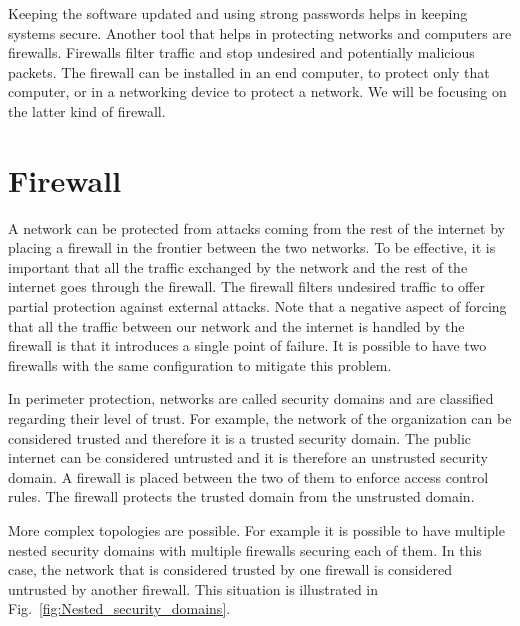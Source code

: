 Keeping the software updated and using strong passwords helps in keeping systems secure.
Another tool that helps in protecting networks and computers are firewalls.
Firewalls filter traffic and stop undesired and potentially malicious packets.
The firewall can be installed in an end computer, to protect only that computer, or in a networking device to protect a network.
We will be focusing on the latter kind of firewall.

\section{Firewall}

A network can be protected from attacks coming from the rest of the internet by placing a firewall in the frontier between the two networks.
To be effective, it is important that all the traffic exchanged by the network and the rest of the internet goes through the firewall.
The firewall filters undesired traffic to offer partial protection against external attacks.
Note that a negative aspect of forcing that all the traffic between our network and the internet is handled by the firewall is that it introduces a single point of failure.
It is possible to have two firewalls with the same configuration to mitigate this problem.

In perimeter protection, networks are called security domains and are classified regarding their level of trust.
For example, the network of the organization can be considered trusted and therefore it is a trusted security domain.
The public internet can be considered untrusted and it is therefore an unstrusted security domain.
A firewall is placed between the two of them to enforce access control rules.
The firewall protects the trusted domain from the unstrusted domain.

More complex topologies are possible.
For example it is possible to have multiple nested security domains with multiple firewalls securing each of them.
In this case, the network that is considered trusted by one firewall is considered untrusted by another firewall.
This situation is illustrated in Fig.~\ref{fig:Nested_security_domains}.

